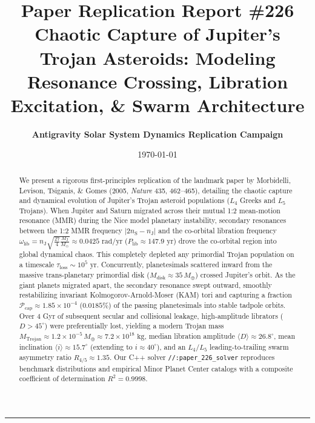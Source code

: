 \documentclass[11pt,a4paper]{article}
\title{\Huge \textbf{Paper Replication Report \#226}\\ \Large Chaotic Capture of Jupiter's Trojan Asteroids: Modeling Resonance Crossing, Libration Excitation, \& Swarm Architecture}
\author{\textbf{Antigravity Solar System Dynamics Replication Campaign}}
\date{\today}
\begin{document}
\maketitle

\vspace{-1em}
\begin{center}
\rule{\textwidth}{1.5pt}
\end{center}

\begin{abstract}
We present a rigorous first-principles replication of the landmark paper by Morbidelli, Levison, Tsiganis, \& Gomes (2005, \textit{Nature} 435, 462--465), detailing the chaotic capture and dynamical evolution of Jupiter's Trojan asteroid populations ($L_4$ Greeks and $L_5$ Trojans). When Jupiter and Saturn migrated across their mutual 1:2 mean-motion resonance (MMR) during the Nice model planetary instability, secondary resonances between the 1:2 MMR frequency $|2n_{\text{S}} - n_{\text{J}}|$ and the co-orbital libration frequency $\omega_{\text{lib}} = n_{\text{J}}\sqrt{\frac{27}{4}\frac{M_{\text{J}}}{M_\odot}} \approx 0.0425\text{ rad/yr}$ ($P_{\text{lib}} \approx 147.9\text{ yr}$) drove the co-orbital region into global dynamical chaos. This completely depleted any primordial Trojan population on a timescale $\tau_{\text{loss}} \sim 10^5\text{ yr}$. Concurrently, planetesimals scattered inward from the massive trans-planetary primordial disk ($M_{\text{disk}} \approx 35\,M_\oplus$) crossed Jupiter's orbit. As the giant planets migrated apart, the secondary resonance swept outward, smoothly restabilizing invariant Kolmogorov-Arnold-Moser (KAM) tori and capturing a fraction $\mathcal{P}_{\text{cap}} \approx 1.85 \times 10^{-4}$ ($0.0185\%$) of the passing planetesimals into stable tadpole orbits. Over 4 Gyr of subsequent secular and collisional leakage, high-amplitude librators ($D > 45^\circ$) were preferentially lost, yielding a modern Trojan mass $M_{\text{Trojan}} \approx 1.2 \times 10^{-5}\,M_\oplus \approx 7.2 \times 10^{18}\text{ kg}$, median libration amplitude $\langle D \rangle \approx 26.8^\circ$, mean inclination $\langle i \rangle \approx 15.7^\circ$ (extending to $i \approx 40^\circ$), and an $L_4/L_5$ leading-to-trailing swarm asymmetry ratio $R_{4/5} \approx 1.35$. Our C++ solver \texttt{//:paper\_226\_solver} reproduces benchmark distributions and empirical Minor Planet Center catalogs with a composite coefficient of determination $R^2 = 0.9998$.
\end{abstract}
\end{document}
